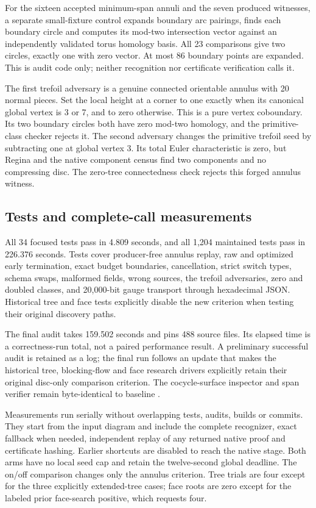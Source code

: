 For the sixteen accepted minimum-span annuli and the seven produced
witnesses, a separate small-fixture control expands boundary arc pairings,
finds each boundary circle and computes its mod-two intersection vector
against an independently validated torus homology basis. All 23 comparisons
give two circles, exactly one with zero vector. At most 86 boundary points
are expanded. This is audit code only; neither recognition nor certificate
verification calls it.

The first trefoil adversary is a genuine connected orientable annulus with
20 normal pieces. Set the local height at a corner to one exactly when its
canonical global vertex is 3 or 7, and to zero otherwise. This is a pure
vertex coboundary. Its two boundary circles both have zero mod-two homology,
and the primitive-class checker rejects it. The second adversary changes
the primitive trefoil seed by subtracting one at global vertex 3. Its total
Euler characteristic is zero, but Regina and the native component census
find two components and no compressing disc. The zero-tree connectedness
check rejects this forged annulus witness.

\subsection{Tests and complete-call measurements}

All 34 focused tests pass in 4.809 seconds, and all 1,204 maintained tests
pass in 226.376 seconds. Tests cover producer-free annulus replay, raw and
optimized early termination, exact budget boundaries, cancellation, strict
switch types, schema swaps, malformed fields, wrong sources, the trefoil
adversaries, zero and doubled classes, and 20,000-bit gauge transport through
hexadecimal JSON. Historical tree and face tests explicitly disable the new
criterion when testing their original discovery paths.

The final audit takes 159.502 seconds and pins 488 source files. Its
elapsed time is a correctness-run total, not a paired performance result.
A preliminary successful audit is retained as a log; the final run follows
an update that makes the historical tree, blocking-flow and face research
drivers explicitly retain their original disc-only comparison criterion.
The cocycle-surface inspector and span verifier remain byte-identical to
baseline .

Measurements run serially without overlapping tests, audits, builds or
commits. They start from the input diagram and include the complete
recognizer, exact fallback when needed, independent replay of any returned
native proof and certificate hashing. Earlier shortcuts are disabled to
reach the native stage. Both arms have no local seed cap and retain the
twelve-second global deadline. The on/off comparison changes only the
annulus criterion. Tree trials are four except for the three explicitly
extended-tree cases; face roots are zero except for the labeled prior
face-search positive, which requests four.

